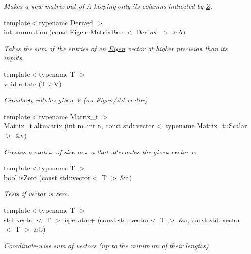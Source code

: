 \begin{DoxyCompactItemize}
\begin{DoxyCompactList}\small\item\em Makes a new matrix out of A keeping only its columns indicated by \hyperlink{classZ}{Z}. \end{DoxyCompactList}\item 
{\footnotesize template$<$typename Derived $>$ }\\int \hyperlink{namespaceMackey_a359aa27a035d2b1f1a3f2f8270fc9e52}{summation} (const Eigen\+::\+Matrix\+Base$<$ Derived $>$ \&A)
\begin{DoxyCompactList}\small\item\em Takes the sum of the entries of an \hyperlink{namespaceEigen}{Eigen} vector at higher precision than its inputs. \end{DoxyCompactList}\item 
{\footnotesize template$<$typename T $>$ }\\void \hyperlink{namespaceMackey_a38a833de54971845cbdb8c96f830725b}{rotate} (T \&V)
\begin{DoxyCompactList}\small\item\em Circularly rotates given V (an Eigen/std vector) \end{DoxyCompactList}\item 
{\footnotesize template$<$typename Matrix\+\_\+t $>$ }\\Matrix\+\_\+t \hyperlink{namespaceMackey_a26a529f63caac9c5b4dc809e0e5831be}{altmatrix} (int m, int n, const std\+::vector$<$ typename Matrix\+\_\+t\+::\+Scalar $>$ \&v)
\begin{DoxyCompactList}\small\item\em Creates a matrix of size m x n that alternates the given vector v. \end{DoxyCompactList}\item 
{\footnotesize template$<$typename T $>$ }\\bool \hyperlink{namespaceMackey_a4c3647777bc890a4649ae24b138bbb79}{is\+Zero} (const std\+::vector$<$ T $>$ \&a)
\begin{DoxyCompactList}\small\item\em Tests if vector is zero. \end{DoxyCompactList}\item 
{\footnotesize template$<$typename T $>$ }\\std\+::vector$<$ T $>$ \hyperlink{namespaceMackey_adb4974b5ffe533abb955ccb6b9096155}{operator+} (const std\+::vector$<$ T $>$ \&a, const std\+::vector$<$ T $>$ \&b)
\begin{DoxyCompactList}\small\item\em Coordinate-\/wise sum of vectors (up to the minimum of their lengths) \end{DoxyCompactList}\item 

\end{DoxyCompactItemize}
